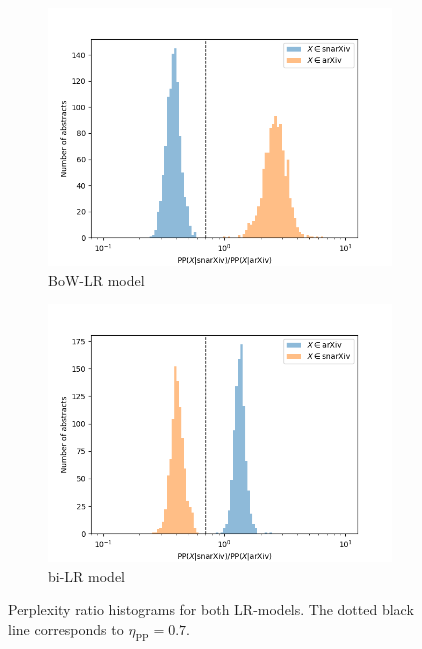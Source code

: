 \documentclass{article}
\begin{document}
\begin{figure}[!htbp] 
\centering
\begin{subfigure}[t]{0.48\textwidth}
  \includegraphics[width=\textwidth]{../figures/BOW_histogram.png}
  \caption{BoW-LR model}
\end{subfigure}
  \hfill
\begin{subfigure}[t]{0.48\textwidth}
  \includegraphics[width=\textwidth]{../figures/bigram_histogram.png}
  \caption{bi-LR model}
\end{subfigure}
\caption{Perplexity ratio histograms for both LR-models. The dotted black line corresponds to $\eta_\text{PP}=0.7$.}
\label{fig:histograms}
\end{figure}
\end{document}
